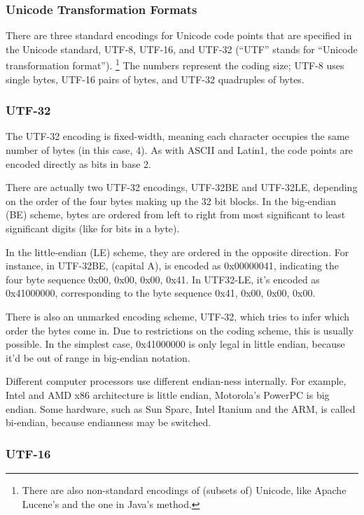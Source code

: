 \subsubsection{Unicode Transformation Formats}

There are three standard encodings for Unicode code points that are
specified in the Unicode standard, UTF-8, UTF-16, and UTF-32 (``UTF''
stands for ``Unicode transformation format'').%
%
\footnote{There are also non-standard encodings of (subsets of) 
Unicode, like Apache Lucene's and the one in Java's
 method.}
%
The numbers represent the coding size; UTF-8 uses single bytes,
UTF-16 pairs of bytes, and UTF-32 quadruples of bytes.

\subsubsection{UTF-32}

The UTF-32 encoding is fixed-width, meaning each character occupies
the same number of bytes (in this case, 4).  As with ASCII and
Latin1, the code points are encoded directly as bits in base 2.

There are actually two UTF-32 encodings, UTF-32BE and UTF-32LE,
depending on the order of the four bytes making up the 32 bit blocks.
In the big-endian (BE) scheme, bytes are ordered from left to right
from most significant to least significant digits (like for bits in a
byte).  

In the little-endian (LE) scheme, they are ordered in the
opposite direction.  For instance, in UTF-32BE, 
(capital A), is encoded as 0x00000041, indicating the four byte
sequence 0x00, 0x00, 0x00, 0x41.  In UTF32-LE, it's encoded as
0x41000000, corresponding to the byte sequence 0x41, 0x00, 0x00, 0x00.

There is also an unmarked encoding scheme, UTF-32, which tries to
infer which order the bytes come in.  Due to restrictions on the
coding scheme, this is usually possible.  In the simplest case,
0x41000000 is only legal in little endian, because it'd be out of
range in big-endian notation.  

Different computer processors use different endian-ness
internally.  For example, Intel and AMD x86 architecture is little
endian, Motorola's PowerPC is big endian.  Some hardware, such
as Sun Sparc, Intel Itanium and the ARM, is called bi-endian, because
endianness may be switched.

\subsubsection{UTF-16}\label{section:utf-16}

